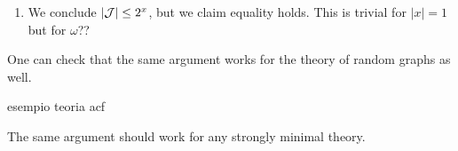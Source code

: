 \documentclass[../main.tex]{subfiles}
\begin{document}
\begin{example}
\begin{enumerate}
			\item	We conclude $|\mathcal{J}| \leq 2^x$, but we claim equality holds. This is trivial for $|x| = 1$ but for $\omega$??
	\end{enumerate}
\end{example}

One can check that the same argument works for the theory of random graphs as well.

\begin{example}
	esempio teoria acf
\end{example}

The same argument should work for any strongly minimal theory.
\end{document}
